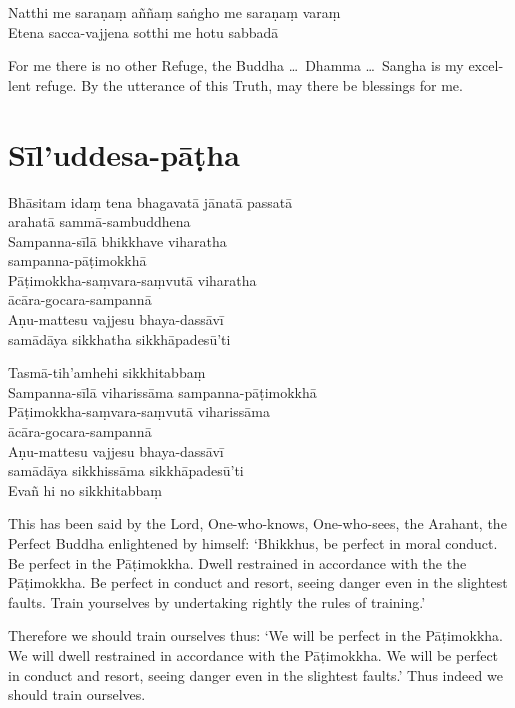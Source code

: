 Natthi me saraṇaṃ aññaṃ saṅgho me saraṇaṃ varaṃ\\
Etena sacca-vajjena sotthi me hotu sabbadā


\begin{english}
  For me there is no other Refuge, the Buddha \ldots\ Dhamma \ldots\ Sangha is
  my excellent refuge. By the utterance of this Truth, may there be blessings
  for me.
\end{english}

\section{Sīl'uddesa-pāṭha}

\begin{leader}
\end{leader}


Bhāsitam idaṃ tena bhagavatā jānatā passatā\\
arahatā sammā-sambuddhena\\
Sampanna-sīlā bhikkhave viharatha\\
sampanna-pāṭimokkhā\\
Pāṭimokkha-saṃvara-saṃvutā viharatha\\
ācāra-gocara-sampannā\\
Aṇu-mattesu vajjesu bhaya-dassāvī\\
samādāya sikkhatha sikkhāpadesū'ti

Tasmā-tih'amhehi sikkhitabbaṃ\\
Sampanna-sīlā viharissāma sampanna-pāṭimokkhā\\
Pāṭimokkha-saṃvara-saṃvutā viharissāma\\
ācāra-gocara-sampannā\\
Aṇu-mattesu vajjesu bhaya-dassāvī\\
samādāya sikkhissāma sikkhāpadesū'ti\\
Evañ hi no sikkhitabbaṃ


\begin{english}
  This has been said by the Lord, One-who-knows, One-who-sees, the Arahant, the
  Perfect Buddha enlightened by himself: `Bhikkhus, be perfect in moral
  conduct. Be perfect in the Pāṭimokkha. Dwell restrained in accordance with the
  the Pāṭimokkha. Be perfect in conduct and resort, seeing danger even in the
  slightest faults. Train yourselves by undertaking rightly the rules of training.'

  \bigskip

  Therefore we should train ourselves thus: `We will be perfect in the
  Pāṭimokkha. We will dwell restrained in accordance with the Pāṭimokkha. We
  will be perfect in conduct and resort, seeing danger even in the slightest
  faults.' Thus indeed we should train ourselves.
\end{english}

